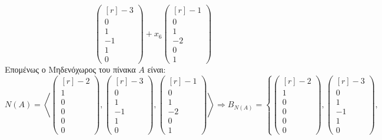 \begin{myitemize}[leftmargin=*]
\[      \begin{pmatrix*}[r] -3 \\ 0 \\ 1 \\ -1 \\ 1 \\ 0  \end{pmatrix*} 
      + x_{6} 
      \begin{pmatrix*}[r] -1 \\ 0 \\ 1 \\ -2 \\ 0 \\ 1  \end{pmatrix*} \!\!
    \] 
    Επομένως ο Μηδενόχωρος του πίνακα $A$ είναι:
    \[
      N(A) = \left< 
      \begin{pmatrix*}[r] -2 \\ 1 \\ 0 \\ 0 \\ 0 \\ 0  \end{pmatrix*}, 
      \begin{pmatrix*}[r] -3 \\ 0 \\ 1 \\ -1 \\ 1 \\ 0  \end{pmatrix*}, 
      \begin{pmatrix*}[r] -1 \\ 0 \\ 1 \\ -2 \\ 0 \\ 1 \end{pmatrix*} \right> 
      \Rightarrow B_{N(A)} = \left\{  
        \begin{pmatrix*}[r] -2 \\ 1 \\ 0 \\ 0 \\ 0 \\ 0  \end{pmatrix*}, 
        \begin{pmatrix*}[r] -3 \\ 0 \\ 1 \\ -1 \\ 1 \\ 0  \end{pmatrix*}, 
\]
\end{myitemize}
